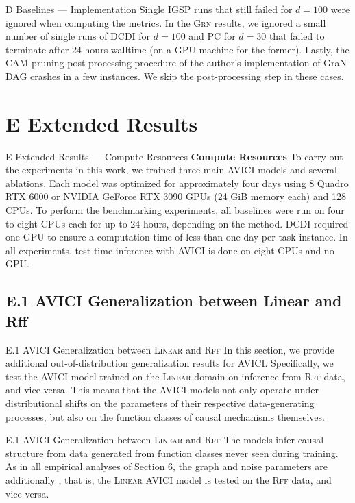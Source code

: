 \documentclass[aspectratio=169,10pt]{beamer}
\newcommand{\domain}[1]{\textsc{#1}}
\newcommand{\lineardomain}{\domain{Linear}\xspace}
\newcommand{\rffdomain}{\domain{Rff}\xspace}
\newcommand{\grndomain}{\domain{Grn}\xspace}
\newcommand{\ood}{\text{o.o.d.}\xspace}
\newcommand{\ours}{AVICI\xspace}
\begin{document}
\begin{frame}{D Baselines --- Implementation}
\small
Single IGSP runs that still failed for $d=100$ were ignored when computing the metrics. In the \grndomain results, we ignored a small number of single runs of DCDI for $d=100$ and PC for $d=30$ that failed to terminate after \num{24} hours walltime (on a GPU machine for the former). Lastly, the CAM pruning post-processing procedure of the author's implementation of GraN-DAG crashes in a few instances. We skip the post-processing step in these cases.
\end{frame}

\section{E Extended Results}

\begin{frame}{E Extended Results --- Compute Resources}
\small
\textbf{Compute Resources}\quad
To carry out the experiments in this work, we trained three main \ours models and several ablations. Each model was optimized for approximately four days using \num{8} Quadro RTX 6000 or NVIDIA GeForce RTX 3090 GPUs (\num{24} GiB memory each) and \num{128} CPUs. To perform the benchmarking experiments, all baselines were run on four to eight CPUs each for up to \num{24} hours, depending on the method. DCDI required one GPU to ensure a computation time of less than one day per task instance. In all experiments, test-time inference with \ours is done on eight CPUs and no GPU.
\end{frame}

\subsection{E.1 \ours Generalization between Linear and Rff}

\begin{frame}{E.1 \ours Generalization between \lineardomain and \rffdomain}
In this section, we provide additional out-of-distribution generalization results for \ours. Specifically, we test the \ours model trained on the \lineardomain domain on inference from \rffdomain data, and vice versa. This means that the \ours models not only operate under distributional shifts on the parameters of their respective data-generating processes, but also on the function classes of causal mechanisms themselves.
\end{frame}

\begin{frame}{E.1 \ours Generalization between \lineardomain and \rffdomain}
The models infer causal structure from data generated from function classes never seen during training. As in all empirical analyses of Section 6, the graph and noise parameters are additionally \ood, that is, the \lineardomain \ours model is tested on the \ood \rffdomain data, and vice versa.
\end{frame}
\end{document}
